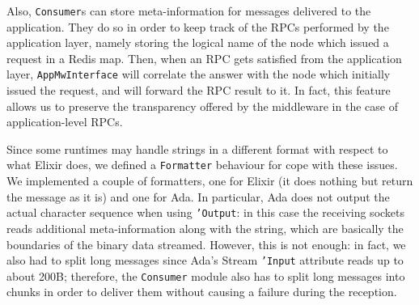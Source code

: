 Also, \texttt{Consumer}s can store meta-information for messages delivered to
the application. They do so in order to keep track of the RPCs performed by the
application layer, namely storing the logical name of the node which issued a
request in a Redis map. Then, when an RPC gets satisfied from the
application layer, \texttt{AppMwInterface} will correlate the answer with the
node which initially issued the request, and will forward the RPC result to it.
In fact, this feature allows us to preserve the transparency offered by the
middleware in the case of application-level RPCs.

Since some runtimes may handle strings in a different format with respect to
what Elixir does, we defined a \texttt{Formatter} behaviour for cope with these
issues.
We implemented a couple of formatters, one for Elixir (it does nothing but
return the message as it is) and one for Ada. In particular, Ada does not
output the actual character sequence when using \texttt{'Output}: in this case
the receiving sockets reads additional meta-information along with the string,
which are basically the boundaries of the binary data streamed.
However, this is not enough: in fact, we also had to split long messages since
Ada's Stream \texttt{'Input} attribute reads up to about 200B; therefore, the
\texttt{Consumer} module also has to split long messages into chunks in order
to deliver them without causing a failure during the reception.
